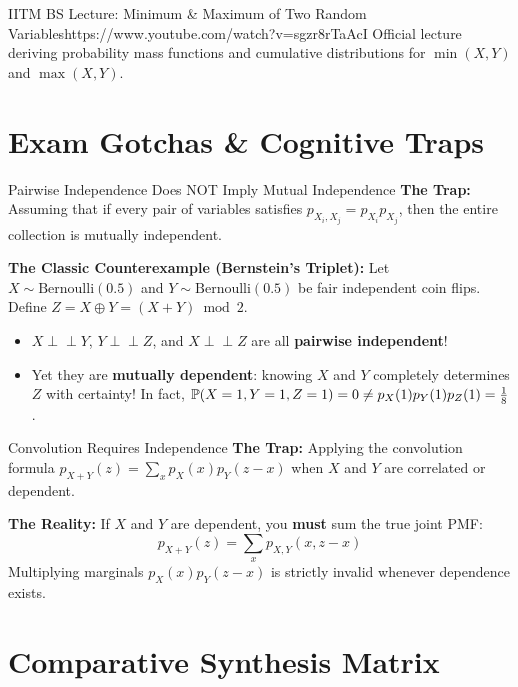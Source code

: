 \begin{videocard}{IITM BS Lecture: Minimum \& Maximum of Two Random Variables}{https://www.youtube.com/watch?v=sgzr8rTaAcI}
Official lecture deriving probability mass functions and cumulative distributions for $\min(X,Y)$ and $\max(X,Y)$.
\end{videocard}

\section{Exam Gotchas \& Cognitive Traps}

\begin{trapbox}{Pairwise Independence Does NOT Imply Mutual Independence}
\textbf{The Trap:} Assuming that if every pair of variables satisfies $p_{X_i, X_j} = p_{X_i} p_{X_j}$, then the entire collection is mutually independent.

\textbf{The Classic Counterexample (Bernstein's Triplet):}
Let $X \sim \text{Bernoulli}(0.5)$ and $Y \sim \text{Bernoulli}(0.5)$ be fair independent coin flips. Define $Z = X \oplus Y = (X + Y) \bmod 2$.
\begin{itemize}
    \item $X \perp\!\!\!\perp Y$, $Y \perp\!\!\!\perp Z$, and $X \perp\!\!\!\perp Z$ are all \textbf{pairwise independent}!
    \item Yet they are \textbf{mutually dependent}: knowing $X$ and $Y$ completely determines $Z$ with certainty! In fact, $\P(X=1, Y=1, Z=1) = 0 \neq p_X(1)p_Y(1)p_Z(1) = \frac{1}{8}$.
\end{itemize}
\end{trapbox}

\begin{trapbox}{Convolution Requires Independence}
\textbf{The Trap:} Applying the convolution formula $p_{X+Y}(z) = \sum_x p_X(x) p_Y(z-x)$ when $X$ and $Y$ are correlated or dependent.

\textbf{The Reality:} If $X$ and $Y$ are dependent, you \textbf{must} sum the true joint PMF:
$$p_{X+Y}(z) = \sum_x p_{X,Y}(x, z - x)$$
Multiplying marginals $p_X(x) p_Y(z-x)$ is strictly invalid whenever dependence exists.
\end{trapbox}

\section{Comparative Synthesis Matrix}

